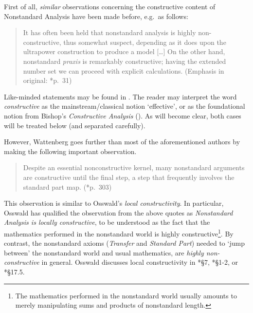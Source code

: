 \documentclass[reqno]{amsart}
\numberwithin{equation}{section}
\numberwithin{thm}{section}
\begin{document}
\medskip

First of all, \emph{similar} observations concerning the constructive content of Nonstandard Analysis have been made before, e.g.\ as follows:
\begin{quote}
{It has often been held that nonstandard analysis is highly non-constructive, thus somewhat suspect, depending as it does upon the ultrapower construction to produce a model \textup{[\dots]} On the other hand, nonstandard \emph{praxis} is remarkably constructive; having the extended number set we can proceed with explicit calculations.} (Emphasis in original: \cite{NORSNSA}*{p.\ 31})
\end{quote}
Like-minded statements may be found in \cites{rossenaap, rosse,kifar, kieken, Oss3, Oss2, sc, nsawork2, venice,fath, jep}.  The reader may interpret the word \emph{constructive} as the mainstream/classical notion `effective', or as the foundational notion from Bishop's \emph{Constructive Analysis} (\cite{bish1}).  
As will become clear, both cases will be treated below (and separated carefully).      

\medskip

However, Wattenberg goes further than most of the aforementioned authors by making the following important observation.
\begin{quote}
Despite an essential nonconstructive kernel, many nonstandard arguments are constructive until the final step, a step that frequently involves the standard part map. (\cite{watje}*{p.\ 303})
\end{quote}
This observation is similar to Osswald's \emph{local constructivity}.  In particular, Osswald has qualified the observation from the above quotes as \emph{Nonstandard Analysis is locally constructive}, to be understood as the fact that the mathematics performed in the nonstandard world is highly constructive\footnote{The mathematics performed in the nonstandard world usually amounts to merely manipulating sums and products of nonstandard length.}.  By contrast, the nonstandard axioms (\emph{Transfer} and \emph{Standard Part}) needed to `jump between' the nonstandard world and usual mathematics, are \emph{highly non-constructive} in general.  Osswald discusses local constructivity in \cite{nsawork2}*{\S7}, \cite{Oss3}*{\S1-2}, or \cite{Oss2}*{\S17.5}.  
\end{document}
